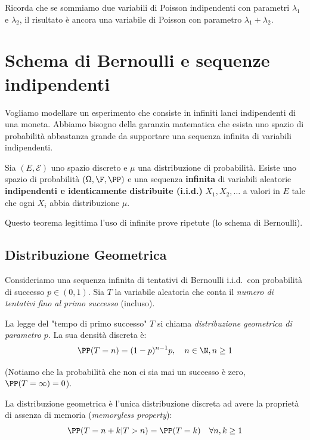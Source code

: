 \begin{hint}
    Ricorda che se sommiamo due variabili di Poisson indipendenti con parametri $\lambda_1$ e $\lambda_2$, il risultato è ancora una variabile di Poisson con parametro $\lambda_1 + \lambda_2$.
\end{hint}

\section{Schema di Bernoulli e sequenze indipendenti}

Vogliamo modellare un esperimento che consiste in infiniti lanci indipendenti di una moneta. Abbiamo bisogno della garanzia matematica che esista uno spazio di probabilità abbastanza grande da supportare una sequenza infinita di variabili indipendenti.

\begin{theorem}
Sia $(E, \mathcal{E})$ uno spazio discreto e $\mu$ una distribuzione di probabilità. Esiste uno spazio di probabilità $(\Omega, \F, \PP)$ e una sequenza \textbf{infinita} di variabili aleatorie \textbf{indipendenti e identicamente distribuite (i.i.d.)} $X_1, X_2, \dots$ a valori in $E$ tale che ogni $X_i$ abbia distribuzione $\mu$.
\end{theorem}

Questo teorema legittima l'uso di infinite prove ripetute (lo schema di Bernoulli).

\subsection{Distribuzione Geometrica}

Consideriamo una sequenza infinita di tentativi di Bernoulli i.i.d.\ con probabilità di successo $p \in (0,1)$. Sia $T$ la variabile aleatoria che conta il \emph{numero di tentativi fino al primo successo} (incluso). 

\begin{definition}
La legge del "tempo di primo successo" $T$ si chiama \emph{distribuzione geometrica di parametro $p$}. La sua densità discreta è:
\[ \PP(T = n) = (1-p)^{n-1} p, \quad n \in \N, n \ge 1 \]
\end{definition}
(Notiamo che la probabilità che non ci sia mai un successo è zero, $\PP(T=\infty)=0$).

\begin{theorem}
La distribuzione geometrica è l'unica distribuzione discreta ad avere la proprietà di assenza di memoria (\emph{memoryless property}):
\[ \PP(T = n + k | T > n) = \PP(T = k) \quad \forall n, k \ge 1 \]
\end{theorem}

